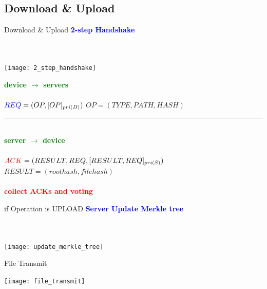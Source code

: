 \documentclass{beamer}
\newcommand{\divider}[1]{\noindent\rule{.9\textwidth}{1pt}}
\begin{document}
\begin{CJK}{UTF8}{bkai}
\subsection{Download \& Upload}
\begin{frame}{Download \& Upload}
	\centering
	\textcolor{blue}{\textbf{2-step Handshake}}\\
	~\\
	~\\
	\begin{minipage}{.3\textwidth}
        \texttt{[image: 2\_step\_handshake]}
    \end{minipage}%
	\begin{minipage}{0.7\textwidth}
		\centering
		\textcolor{green}{\textbf{device $\rightarrow$ servers}}\\
		~\\
		$\textcolor{blue}{REQ} = (OP, [OP]_{pri(D)})$
		$OP = (TYPE, PATH, HASH)$
        \divider{}\\
        \textcolor{green}{\textbf{server $\rightarrow$ device}}\\
		~\\
        $\textcolor{red}{ACK} = (RESULT, REQ, [RESULT, REQ]_{pri(S)})$
        $RESULT = (roothash, filehash)$\\
        ~\\
        \textcolor{red}{\textbf{collect ACKs and voting}}
    \end{minipage}%
\end{frame}

\begin{frame}{if Operation is UPLOAD}
	\centering
	\textcolor{blue}{\textbf{Server Update Merkle tree}}\\
	~\\
	~\\
	\begin{center}
		\texttt{[image: update\_merkle\_tree]}
	\end{center}
\end{frame}

\begin{frame}{File Transmit}
	\begin{center}
		\texttt{[image: file\_transmit]}
	\end{center}
\end{frame}


\end{CJK}
\end{document}
